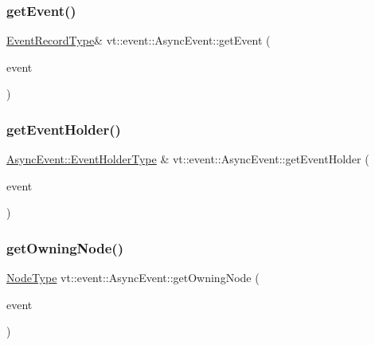 \subsubsection{\texorpdfstring{get\+Event()}{getEvent()}}
{\footnotesize\ttfamily \hyperlink{structvt_1_1event_1_1_async_event_a5b4ef37db6e5962fdc0e6e0e56e74bc1}{Event\+Record\+Type}\& vt\+::event\+::\+Async\+Event\+::get\+Event (\begin{DoxyParamCaption}\item[{\hyperlink{namespacevt_a009267401def7ae8bf201892222d060f}{Event\+Type} const \&}]{event }\end{DoxyParamCaption})}

\mbox{\label{structvt_1_1event_1_1_async_event_a27d14dba4b35f66aad75d46fb56227a9}} 
\subsubsection{\texorpdfstring{get\+Event\+Holder()}{getEventHolder()}}
{\footnotesize\ttfamily \hyperlink{structvt_1_1event_1_1_async_event_a6b529d829ccb5b12c50c2b1978c41a86}{Async\+Event\+::\+Event\+Holder\+Type} \& vt\+::event\+::\+Async\+Event\+::get\+Event\+Holder (\begin{DoxyParamCaption}\item[{\hyperlink{namespacevt_a009267401def7ae8bf201892222d060f}{Event\+Type} const \&}]{event }\end{DoxyParamCaption})}

\mbox{\label{structvt_1_1event_1_1_async_event_a288c3db66bf12de8dc65733b184870c0}} 
\subsubsection{\texorpdfstring{get\+Owning\+Node()}{getOwningNode()}}
{\footnotesize\ttfamily \hyperlink{namespacevt_a866da9d0efc19c0a1ce79e9e492f47e2}{Node\+Type} vt\+::event\+::\+Async\+Event\+::get\+Owning\+Node (\begin{DoxyParamCaption}\item[{\hyperlink{namespacevt_a009267401def7ae8bf201892222d060f}{Event\+Type} const \&}]{event }\end{DoxyParamCaption})}

